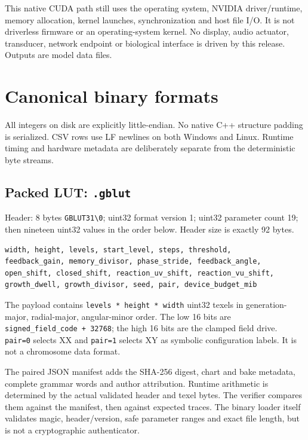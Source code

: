 \documentclass[11pt,a4paper]{article}
\begin{document}
This native CUDA path still uses the operating system, NVIDIA driver/runtime, memory allocation, kernel launches, synchronization and host file I/O. It is not driverless firmware or an operating-system kernel. No display, audio actuator, transducer, network endpoint or biological interface is driven by this release. Outputs are model data files.

\clearpage

\section{Canonical binary formats}\label{canonical-binary-formats}

All integers on disk are explicitly little-endian. No native C++ structure padding is serialized. CSV rows use LF newlines on both Windows and Linux. Runtime timing and hardware metadata are deliberately separate from the deterministic byte streams.

\subsection{\texorpdfstring{Packed LUT: \texttt{.gblut}}{Packed LUT: .gblut}}\label{packed-lut-.gblut}

Header: 8 bytes \texttt{GBLUT31\textbackslash{}0}; uint32 format version 1; uint32 parameter count 19; then nineteen uint32 values in the order below. Header size is exactly 92 bytes.

\par
\begin{minipage}{\linewidth}
\begin{verbatim}
width, height, levels, start_level, steps, threshold,
feedback_gain, memory_divisor, phase_stride, feedback_angle,
open_shift, closed_shift, reaction_uv_shift, reaction_vu_shift,
growth_dwell, growth_divisor, seed, pair, device_budget_mib
\end{verbatim}
\end{minipage}
\par

The payload contains \texttt{levels\ *\ height\ *\ width} uint32 texels in generation-major, radial-major, angular-minor order. The low 16 bits are \texttt{signed\_field\_code\ +\ 32768}; the high 16 bits are the clamped field drive. \texttt{pair=0} selects XX and \texttt{pair=1} selects XY as symbolic configuration labels. It is not a chromosome data format.

The paired JSON manifest adds the SHA-256 digest, chart and bake metadata, complete grammar words and author attribution. Runtime arithmetic is determined by the actual validated header and texel bytes. The verifier compares them against the manifest, then against expected traces. The binary loader itself validates magic, header/version, safe parameter ranges and exact file length, but is not a cryptographic authenticator.
\end{document}
